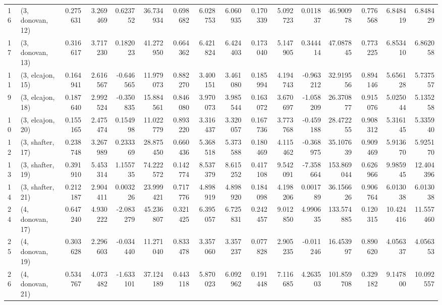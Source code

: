 \begin{tabular}{llrrrrrrrrrrrrrr}
16 &  (3, donovan, 12) &   0.275631 &  3.269469 &  0.623752 &  36.734934 &  0.698682 &   6.028753 &  6.060935 &  0.170339 &   5.092723 &  0.011837 &   46.900978 &  0.776568 &   6.848419 &   6.848429 \\
17 &  (3, donovan, 13) &   0.316617 &  3.717230 &  0.182023 &  41.272950 &  0.664362 &   6.421824 &  6.424403 &  0.173040 &   5.147905 &  0.344414 &   47.087845 &  0.773225 &   6.853410 &   6.862058 \\
11 &  (3, elcajon, 15) &   0.164941 &  2.616567 & -0.646565 &  11.979073 &  0.882270 &   3.400151 &  3.461080 &  0.185994 &   4.194743 & -0.963212 &   32.919556 &  0.894146 &   5.656128 &   5.737557 \\
9  &  (3, elcajon, 18) &   0.187640 &  2.992524 & -0.350835 &  15.884561 &  0.846080 &   3.970073 &  3.985544 &  0.163072 &   3.670697 & -1.058209 &   26.370877 &  0.915076 &   5.025044 &   5.135258 \\
10 &  (3, elcajon, 20) &   0.155165 &  2.475474 &  0.154998 &  11.022779 &  0.893220 &   3.316437 &  3.320057 &  0.167736 &   3.773768 & -0.459188 &   28.472255 &  0.908312 &   5.316145 &   5.335940 \\
12 &  (3, shafter, 17) &   0.238748 &  3.267989 &  0.233369 &  28.875450 &  0.660436 &   5.368518 &  5.373588 &  0.180469 &   4.115462 & -0.368975 &   35.107639 &  0.909469 &   5.913670 &   5.925170 \\
13 &  (3, shafter, 19) &   0.391910 &  5.453314 &  1.155735 &  74.222572 &  0.142774 &   8.537379 &  8.615252 &  0.417108 &   9.542091 & -7.358664 &  153.869044 &  0.626966 &   9.985945 &  12.404396 \\
14 &  (3, shafter, 21) &   0.212187 &  2.904411 &  0.003226 &  23.999421 &  0.717776 &   4.898919 &  4.898920 &  0.184098 &   4.198206 &  0.001789 &   36.156626 &  0.906764 &   6.013038 &   6.013038 \\
24 &  (4, donovan, 17) &   0.647240 &  4.930222 & -2.083279 &  45.236807 &  0.321425 &   6.395057 &  6.725831 &  0.242457 &   9.012850 &  4.990635 &  133.574885 &  0.120315 &  10.424416 &  11.557460 \\
25 &  (4, donovan, 19) &   0.303628 &  2.296603 & -0.034440 &  11.271040 &  0.833478 &   3.357060 &  3.357237 &  0.077828 &   2.905235 & -0.011246 &   16.453997 &  0.890620 &   4.056337 &   4.056353 \\
26 &  (4, donovan, 21) &   0.534767 &  4.073482 & -1.633101 &  37.124189 &  0.443118 &   5.870023 &  6.092962 &  0.191448 &   7.116685 &  4.263503 &  101.859708 &  0.329182 &   9.147800 &  10.092557 \\

\end{tabular}
